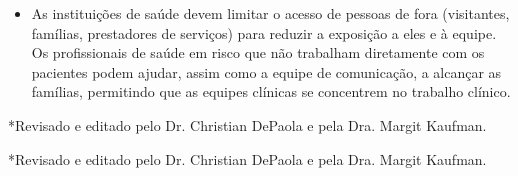 \documentclass[onecolumn,journal]{IEEEtran}
\begin{document}
\begin{multicols}{2}
\begin{itemize}
    \item As instituições de saúde devem limitar o acesso de pessoas de fora (visitantes, famílias, prestadores de serviços) para reduzir a exposição a eles e à equipe. Os profissionais de saúde em risco que não trabalham diretamente com os pacientes podem ajudar, assim como a equipe de comunicação, a alcançar as famílias, permitindo que as equipes clínicas se concentrem no trabalho clínico.
    
\end{itemize}

*Revisado e editado pelo Dr. Christian DePaola e pela Dra. Margit Kaufman.

\end{multicols}

*Revisado e editado pelo Dr. Christian DePaola e pela Dra. Margit Kaufman.

% 

\end{document}
